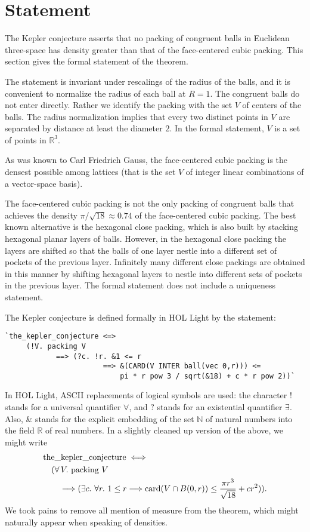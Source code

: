 \documentclass{amsart}
\newcommand{\ring}[1]{\mathbb{#1}}
\newcommand{\op}[1]{\hbox{#1}}
\begin{document}


\section{Statement}

The Kepler conjecture asserts that no packing of congruent balls in
Euclidean three-space has density greater than that of the
face-centered cubic packing.  This section gives the formal statement
of the theorem.

The statement is invariant under rescalings of the radius of the
balls, and it is convenient to normalize the radius of each ball at
$R=1$.  The congruent balls do not enter directly. Rather we identify
the packing with the set $V$ of centers of the balls.  The radius
normalization implies that every two distinct points in $V$ are
separated by distance at least the diameter $2$.  In the formal
statement, $V$ is a set of points in $\ring{R}^3$.

As was known to Carl Friedrich Gauss, the face-centered cubic packing
is the densest possible among lattices (that is the set $V$ of integer
linear combinations of a vector-space basis).

The face-centered cubic packing is not the only packing of congruent
balls that achieves the density $\pi/\sqrt{18} \approx 0.74$ of the
face-centered cubic packing.  The best known alternative is the
hexagonal close packing, which is also built by stacking hexagonal
planar layers of balls.  However, in the hexagonal close packing the
layers are shifted so that the balls of one layer nestle into a different
set of pockets of the previous layer.  Infinitely many different
close packings are obtained in this manner by shifting hexagonal
layers to nestle into different sets of pockets in the previous
layer.  The formal statement does not include a uniqueness statement.

The Kepler conjecture is defined formally in HOL Light by the statement:
\begin{verbatim}
`the_kepler_conjecture <=>
     (!V. packing V
            ==> (?c. !r. &1 <= r
                       ==> &(CARD(V INTER ball(vec 0,r))) <=
                           pi * r pow 3 / sqrt(&18) + c * r pow 2))`
\end{verbatim}
In HOL Light, ASCII replacements of logical symbols are used:
the character $!$ stands for a universal quantifier $\forall$,
and $?$ stands for an existential quantifier $\exists$.
Also, \& stands for the explicit embedding of the set $\ring{N}$ of natural
numbers into the field $\ring{R}$ of real numbers.  In a slightly
cleaned up version of the above, we might write
\begin{align*}
&\op{the\_kepler\_conjecture} \iff\\
&\quad (\forall\, V.\ \op{packing}\ V\\
&\quad\quad \Longrightarrow (\exists c.\ \forall r.\ 1 \le r \Longrightarrow
\op{card}(V \cap B(0,r)) \le
\frac{\pi r^3}{\sqrt{18}} + c r^2)).
\end{align*}
We took pains to remove all mention of measure from the theorem, which
might naturally appear when speaking of densities.
\end{document}
